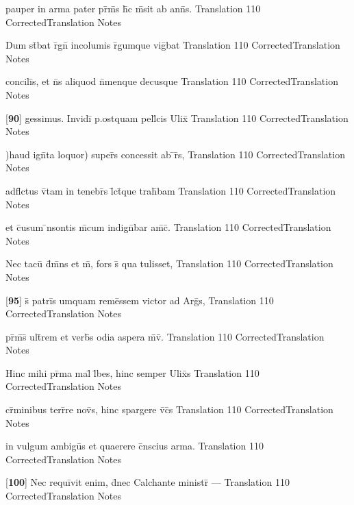 \latline
  {pauper in arma pater pr\={\macron {\i}}m\={\macron {\i}}s h\={}c m\={\macron {\i}}sit ab ann\={\macron {\i}}s.}
  { Translation }
  {110}
  { CorrectedTranslation }
  { Notes }


\latline
  {Dum st\={}bat r\={}gn\={} incolumis r\={}gumque vig\={}bat}
  { Translation }
  {110}
  { CorrectedTranslation }
  { Notes }


\latline
  {concili\={\macron {\i}}s, et n\={}s aliquod n\={}menque decusque}
  { Translation }
  {110}
  { CorrectedTranslation }
  { Notes }


\latline
  {[\textbf{90}] gessimus.  Invidi\={} p.ostquam pell\={}cis Ulix\={\macron {\i}}}
  { Translation }
  {110}
  { CorrectedTranslation }
  { Notes }


\latline
  {)haud ign\={}ta loquor) super\={\macron {\i}}s concessit ab \={}r\={\macron {\i}}s,}
  { Translation }
  {110}
  { CorrectedTranslation }
  { Notes }


\latline
  {adfl\={\macron {\i}}ctus v\={\macron {\i}}tam in tenebr\={\macron {\i}}s l\={}ct\={}que trah\={}bam}
  { Translation }
  {110}
  { CorrectedTranslation }
  { Notes }


\latline
  {et c\={}usum \={\macron {\i}}nsontis m\={}cum indign\={}bar am\={\macron {\i}}c\={\macron {\i}}.}
  { Translation }
  {110}
  { CorrectedTranslation }
  { Notes }


\latline
  {Nec tacu\={\macron {\i}} d\={}m\={}ns et m\={}, fors s\={\macron {\i}} qua tulisset,}
  { Translation }
  {110}
  { CorrectedTranslation }
  { Notes }


\latline
  {[\textbf{95}] s\={\macron {\i}} patri\={}s umquam reme\={}ssem victor ad Arg\={}s,}
  { Translation }
  {110}
  { CorrectedTranslation }
  { Notes }


\latline
  {pr\={}m\={\macron {\i}}s\={\macron {\i}} ult\={}rem et verb\={\macron {\i}}s odia aspera m\={}v\={\macron {\i}}.}
  { Translation }
  {110}
  { CorrectedTranslation }
  { Notes }


\latline
  {Hinc mihi pr\={\macron {\i}}ma mal\={\macron {\i}} l\={}bes, hinc semper Ulix\={}s}
  { Translation }
  {110}
  { CorrectedTranslation }
  { Notes }


\latline
  {cr\={\macron {\i}}minibus terr\={}re nov\={\macron {\i}}s, hinc spargere v\={}c\={}s}
  { Translation }
  {110}
  { CorrectedTranslation }
  { Notes }


\latline
  {in vulgum ambigu\={}s et quaerere c\={}nscius arma.}
  { Translation }
  {110}
  { CorrectedTranslation }
  { Notes }


\latline
  {[\textbf{100}] Nec requi\={}vit enim, d\={}nec Calchante ministr\={} ---}
  { Translation }
  {110}
  { CorrectedTranslation }
  { Notes }



